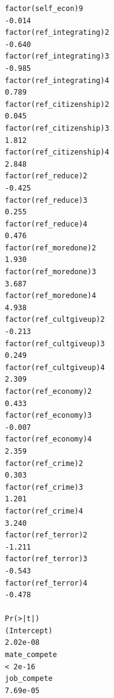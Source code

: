 \documentclass[
]{article}
\begin{document}
\begin{table}
\begin{minipage}[t]{\linewidth}
{\begin{verbatim}
factor(self_econ)9                                                                 -0.014
factor(ref_integrating)2                                                           -0.640
factor(ref_integrating)3                                                           -0.985
factor(ref_integrating)4                                                            0.789
factor(ref_citizenship)2                                                            0.045
factor(ref_citizenship)3                                                            1.812
factor(ref_citizenship)4                                                            2.848
factor(ref_reduce)2                                                                -0.425
factor(ref_reduce)3                                                                 0.255
factor(ref_reduce)4                                                                 0.476
factor(ref_moredone)2                                                               1.930
factor(ref_moredone)3                                                               3.687
factor(ref_moredone)4                                                               4.938
factor(ref_cultgiveup)2                                                            -0.213
factor(ref_cultgiveup)3                                                             0.249
factor(ref_cultgiveup)4                                                             2.309
factor(ref_economy)2                                                                0.433
factor(ref_economy)3                                                               -0.007
factor(ref_economy)4                                                                2.359
factor(ref_crime)2                                                                  0.303
factor(ref_crime)3                                                                  1.201
factor(ref_crime)4                                                                  3.240
factor(ref_terror)2                                                                -1.211
factor(ref_terror)3                                                                -0.543
factor(ref_terror)4                                                                -0.478
                                                                                  Pr(>|t|)
(Intercept)                                                                       2.02e-08
mate_compete                                                                       < 2e-16
job_compete                                                                       7.69e-05

\end{verbatim}}
\end{minipage}
\end{table}
\end{document}
